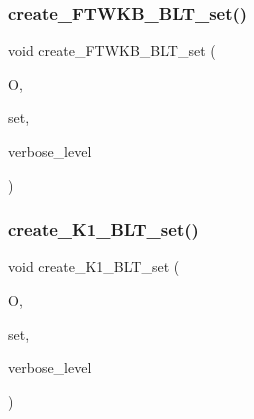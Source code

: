 \mbox{\label{data_8_c_a59a135f290180c4c3d9566bc13321089}} 
\subsubsection{\texorpdfstring{create\+\_\+\+F\+T\+W\+K\+B\+\_\+\+B\+L\+T\+\_\+set()}{create\_FTWKB\_BLT\_set()}}
{\footnotesize\ttfamily void create\+\_\+\+F\+T\+W\+K\+B\+\_\+\+B\+L\+T\+\_\+set (\begin{DoxyParamCaption}\item[{\mbox{\hyperlink{classorthogonal}{orthogonal}} $\ast$}]{O,  }\item[{\mbox{\hyperlink{galois_8h_a09fddde158a3a20bd2dcadb609de11dc}{I\+NT}} $\ast$}]{set,  }\item[{\mbox{\hyperlink{galois_8h_a09fddde158a3a20bd2dcadb609de11dc}{I\+NT}}}]{verbose\+\_\+level }\end{DoxyParamCaption})}

\mbox{\label{data_8_c_a06c256ed4f594ebc7be0780d13512f0a}} 
\subsubsection{\texorpdfstring{create\+\_\+\+K1\+\_\+\+B\+L\+T\+\_\+set()}{create\_K1\_BLT\_set()}}
{\footnotesize\ttfamily void create\+\_\+\+K1\+\_\+\+B\+L\+T\+\_\+set (\begin{DoxyParamCaption}\item[{\mbox{\hyperlink{classorthogonal}{orthogonal}} $\ast$}]{O,  }\item[{\mbox{\hyperlink{galois_8h_a09fddde158a3a20bd2dcadb609de11dc}{I\+NT}} $\ast$}]{set,  }\item[{\mbox{\hyperlink{galois_8h_a09fddde158a3a20bd2dcadb609de11dc}{I\+NT}}}]{verbose\+\_\+level }\end{DoxyParamCaption})}

\mbox{\label{data_8_c_a2eb4d1ce02b1409aa976708588068c2f}} 
